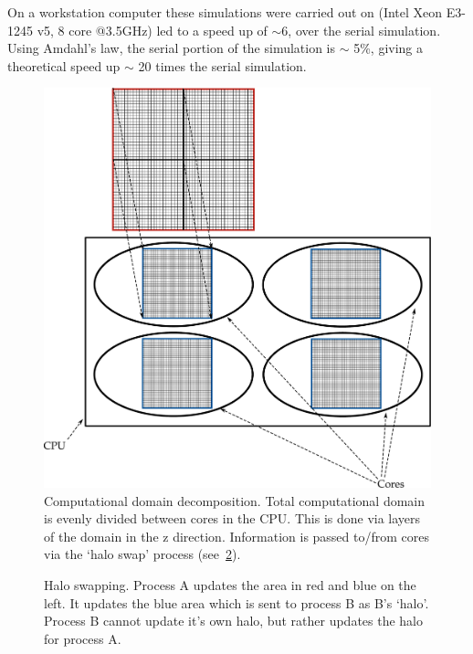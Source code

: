 On a workstation computer these simulations were carried out on (Intel Xeon E3-1245 v5, 8 core @3.5GHz) led to a speed up of $\sim$6, over the serial simulation. Using Amdahl's law\cite{amdahl1967validity}, the serial portion of the simulation is $\sim$ 5\%, giving a theoretical speed up $\sim$ 20 times the serial simulation.


\begin{figure}
\vspace{-45pt}
\centering
\includegraphics[scale=.35]{./ablation/images/grid-decomp.pdf}
\caption{Computational domain decomposition. Total computational domain is evenly divided between cores in the CPU. This is done via layers of the domain in the z direction. Information is passed to/from cores via the `halo swap' process (see~\cref{fig:haloswap}).}
\label{fig:griddecomp}
\vspace{-10pt}
\end{figure}

\begin{figure}
\centering
\def\svgwidth{350pt}

\caption{Halo swapping. Process A updates the area in red and blue on the left. It updates the blue area which is sent to process B as B's `halo'. Process B cannot update it's own halo, but rather updates the halo for process A.}
\label{fig:haloswap}
\end{figure}


